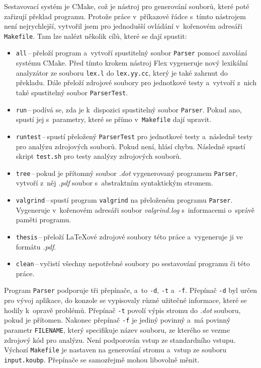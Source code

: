 Sestavovací systém je CMake, což je nástroj pro generování souborů, které poté zařizují překlad programu.
Protože práce v~příkazové řádce s~tímto nástrojem není nejrychlejší, vytvořil jsem pro jednodušší ovládání v~kořenovém adresáři \texttt{Makefile}.
Tam lze nalézt několik cílů, které se dají spustit:
\begin{itemize}
    \item \texttt{all}\,--\,přeloží program a~vytvoří spustitelný soubor \texttt{Parser} pomocí zavolání systému CMake.
    Před tímto krokem nástroj Flex vygeneruje nový lexikální analyzátor ze souboru \texttt{lex.l} do \texttt{lex.yy.cc}, který je také zahrnut do překladu. 
    Dále přeloží zdrojové soubory pro jednotkové testy a~vytvoří z~nich také spustitelný soubor \texttt{ParserTest}.
    \item \texttt{run}\,--\,podívá se, zda je k~dispozici spustitelný soubor \texttt{Parser}. Pokud ano, spustí jej s~parametry, které se přímo v~\texttt{Makefile} dají upravit.
    \item \texttt{runtest}\,--\,spustí přeložený \texttt{ParserTest} pro jednotkové testy a~následně testy pro analýzu zdrojových souborů. Pokud není, hlásí chybu.
    Následně spustí skript \texttt{test.sh} pro testy analýzy zdrojových souborů.
    \item \texttt{tree}\,--\,pokud je přítomný soubor \emph{.dot} vygenerovaný programem \texttt{Parser}, vytvoří z~něj \emph{.pdf} soubor s~abstraktním syntaktickým stromem.
    \item \texttt{valgrind}\,--\,spustí program \texttt{valgrind} na přeloženém programu \texttt{Parser}. Vygeneruje v~kořenovém adresáři soubor \emph{valgrind.log} s~informacemi o~správě paměti programu.
    \item \texttt{thesis}\,--\,přeloží \LaTeX ové zdrojové soubory této práce a~vygeneruje ji ve formátu \emph{.pdf}. 
    \item \texttt{clean}\,--\,vyčistí všechny nepotřebné soubory po sestavování programu či této práce.
\end{itemize}

Program \texttt{Parser} podporuje tři přepínače, a~to \texttt{-d}, \texttt{-t} a~\texttt{-f}.
Přepínač \texttt{-d} byl určen pro vývoj aplikace, do konzole se vypisovaly různé užitečné informace, které se hodily k~opravě problémů.
Přepínač \texttt{-t} povolí výpis stromu do \emph{.dot} souboru, pokud je přítomen.
Nakonec přepínač \texttt{-f} je jediný povinný a~má povinný parametr \texttt{FILENAME}, který specifikuje název souboru, ze kterého se vezme zdrojový kód pro analýzu.
Není podporován vstup ze standardního vstupu.
Výchozí \texttt{Makefile} je nastaven na generování stromu a~vstup ze souboru \texttt{input.koubp}.
Přepínače se samozřejmě mohou libovolně měnit.


